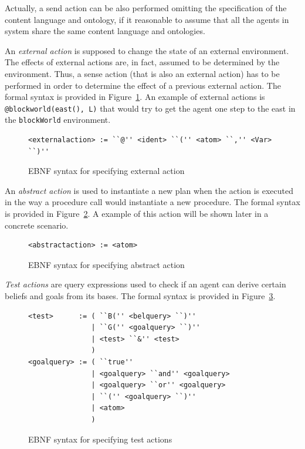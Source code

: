 \documentclass[a4paper]{article}
\begin{document}
Actually, a send action can be also performed omitting the specification of the content language and ontology, if it reasonable to assume that all the agents in system share the same content language and ontologies.

An \emph{external action} is supposed to change the state of an external environment. The effects of external actions are, in fact, assumed to be determined by the environment. Thus, a sense action (that is also an external action) has to be performed in order to determine the effect of a previous external action. The formal syntax is provided in Figure~\ref{fig:ebnf_extaction}. An example of external actions is \texttt{@blockworld(east(), L)} that would try to get the agent one step to the east in the \texttt{blockWorld} environment.

\begin{figure}[htp]
\begin{verbatim}
<externalaction> := ``@'' <ident> ``('' <atom> ``,'' <Var> ``)''
\end{verbatim}
\caption{EBNF syntax for specifying external action}
\label{fig:ebnf_extaction}
\end{figure}

An \emph{abstract action} is used to instantiate a new plan when the action is executed in the way a procedure call would instantiate a new procedure. The formal syntax is provided in Figure~\ref{fig:ebnf_absaction}. A example of this action will be shown later in a concrete scenario.

\begin{figure}[htp]
\begin{verbatim}
<abstractaction> := <atom>
\end{verbatim}
\caption{EBNF syntax for specifying abstract action}
\label{fig:ebnf_absaction}
\end{figure}

\emph{Test actions} are query expressions used to check if an agent can derive certain beliefs and goals from its bases. The formal syntax is provided in Figure~\ref{fig:ebnf_testaction}.

\begin{figure}[htp]
\begin{verbatim}
<test>      := ( ``B('' <belquery> ``)'' 
               | ``G('' <goalquery> ``)''
               | <test> ``&'' <test>
               )
<goalquery> := ( ``true'' 
               | <goalquery> ``and'' <goalquery>
               | <goalquery> ``or'' <goalquery>
               | ``('' <goalquery> ``)''
               | <atom>
               )
\end{verbatim}
\caption{EBNF syntax for specifying test actions}
\label{fig:ebnf_testaction}
\end{figure}
\end{document}
